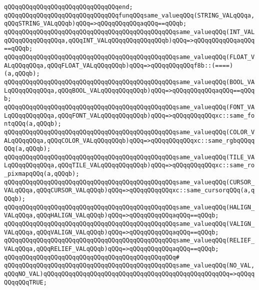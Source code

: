 \verb|qQQqqQQqqQQqqQQqqQQqqQQqqQQqqQQqend;|\newline
\newline
\verb|qQQqqQQqqQQqqQQqqQQqqQQqqQQqqQQqfunqQQqsame_valueqQQq(STRING_VALqQQqa,qQQqSTRING_VALqQQqb)qQQq=>qQQqqQQqqQQqaqQQq==qQQqb;|\newline
\verb|qQQqqQQqqQQqqQQqqQQqqQQqqQQqqQQqqQQqqQQqqQQqqQQqsame_valueqQQq(INT_VALqQQqqQQqqQQqqQQqa,qQQqINT_VALqQQqqQQqqQQqqQQqb)qQQq=>qQQqqQQqqQQqaqQQq==qQQqb;|\newline
\verb|qQQqqQQqqQQqqQQqqQQqqQQqqQQqqQQqqQQqqQQqqQQqqQQqsame_valueqQQq(FLOAT_VALqQQqqQQqa,qQQqFLOAT_VALqQQqqQQqb)qQQq=>qQQqqQQqqQQqf8b::(====)(a,qQQqb);|\newline
\verb|qQQqqQQqqQQqqQQqqQQqqQQqqQQqqQQqqQQqqQQqqQQqqQQqsame_valueqQQq(BOOL_VALqQQqqQQqqQQqa,qQQqBOOL_VALqQQqqQQqqQQqb)qQQq=>qQQqqQQqqQQqaqQQq==qQQqb;|\newline
\verb|qQQqqQQqqQQqqQQqqQQqqQQqqQQqqQQqqQQqqQQqqQQqqQQqsame_valueqQQq(FONT_VALqQQqqQQqqQQqa,qQQqFONT_VALqQQqqQQqqQQqb)qQQq=>qQQqqQQqqQQqxc::same_fontqQQq(a,qQQqb);|\newline
\verb|qQQqqQQqqQQqqQQqqQQqqQQqqQQqqQQqqQQqqQQqqQQqqQQqsame_valueqQQq(COLOR_VALqQQqqQQqa,qQQqCOLOR_VALqQQqqQQqb)qQQq=>qQQqqQQqqQQqxc::same_rgbqQQqqQQq(a,qQQqb);|\newline
\verb|qQQqqQQqqQQqqQQqqQQqqQQqqQQqqQQqqQQqqQQqqQQqqQQqsame_valueqQQq(TILE_VALqQQqqQQqqQQqa,qQQqTILE_VALqQQqqQQqqQQqb)qQQq=>qQQqqQQqqQQqxc::same_ro_pixmapqQQq(a,qQQqb);|\newline
\verb|qQQqqQQqqQQqqQQqqQQqqQQqqQQqqQQqqQQqqQQqqQQqqQQqsame_valueqQQq(CURSOR_VALqQQqa,qQQqCURSOR_VALqQQqb)qQQq=>qQQqqQQqqQQqxc::same_cursorqQQq(a,qQQqb);|\newline
\verb|qQQqqQQqqQQqqQQqqQQqqQQqqQQqqQQqqQQqqQQqqQQqqQQqsame_valueqQQq(HALIGN_VALqQQqa,qQQqHALIGN_VALqQQqb)qQQq=>qQQqqQQqqQQqaqQQq==qQQqb;|\newline
\verb|qQQqqQQqqQQqqQQqqQQqqQQqqQQqqQQqqQQqqQQqqQQqqQQqsame_valueqQQq(VALIGN_VALqQQqa,qQQqVALIGN_VALqQQqb)qQQq=>qQQqqQQqqQQqaqQQq==qQQqb;|\newline
\verb|qQQqqQQqqQQqqQQqqQQqqQQqqQQqqQQqqQQqqQQqqQQqqQQqsame_valueqQQq(RELIEF_VALqQQqa,qQQqRELIEF_VALqQQqb)qQQq=>qQQqqQQqqQQqaqQQq==qQQqb;|\newline
\verb|qQQqqQQqqQQqqQQqqQQqqQQqqQQqqQQqqQQqqQQqqQQqqQQq#|\newline
\verb|qQQqqQQqqQQqqQQqqQQqqQQqqQQqqQQqqQQqqQQqqQQqqQQqsame_valueqQQq(NO_VAL,qQQqNO_VAL)qQQqqQQqqQQqqQQqqQQqqQQqqQQqqQQqqQQqqQQqqQQqqQQqqQQq=>qQQqqQQqqQQqTRUE;|\newline
